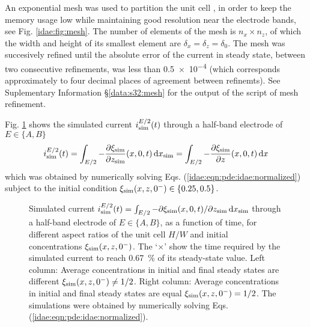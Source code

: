 An exponential mesh was used to partition the unit cell \cite[\S7.2]{Britz:2016:},
in order to keep the memory usage low while maintaining good resolution near the electrode bands, see Fig. \ref{idae:fig:mesh}.
The number of elements of the mesh is $n_{x} \times n_{z}$,
of which the width and height of its smallest element are $\delta_{x} = \delta_{z} = \delta_{0}$.
The mesh was succesively refined until the absolute error of the current in steady state,
between two consecutive refinements, was less than \num{0,5e-4}
(which corresponds approximately to four decimal places of agreement between refinemts).
See Suplementary Information \S\ref{data:s32:mesh} for the output of the script of mesh refinement.

Fig. \ref{idae:fig:i_sim} shows the simulated current $i_{\mathrm{sim}}^{E/2}(t)$
through a half-band electrode of $E \in \{A,B\}$
\begin{equation}
	i_{\mathrm{sim}}^{E/2}(t)
	= \int_{E/2} -\frac{\partial \xi_{\mathrm{sim}}}{\partial z_{\mathrm{sim}}}(x,0,t) \,\mathrm{d}x_{\mathrm{sim}}
	= \int_{E/2} -\frac{\partial \xi_{\mathrm{sim}}}{\partial z}(x,0,t) \,\mathrm{d}x
\end{equation}
which was obtained by numerically solving Eqs. (\ref{idae:eqn:pde:idae:normalized})
subject to the initial condition $\xi\simu(x,z,0^{-}) \in \{\numlist[list-pair-separator={,}]{0,25; 0,5}\}$.

\begin{figure*}
	\centering


	\caption{
		Simulated current $i_{\mathrm{sim}}^{E/2}(t) = \int_{E/2} -\partial \xi_{\mathrm{sim}}(x,0,t)/ \partial z_{\mathrm{sim}} \,\mathrm{d}x_{\mathrm{sim}}$ through a half-band electrode of $E \in \{A,B\}$,
		as a function of time, for different aspect ratios of the unit cell $H/W$ and initial concentrations $\xi_{\mathrm{sim}}(x,z,0^{-})$.
		The `$\times$' show the time required by the simulated current to reach \SI{0,67}{\percent} of its steady-state value.
		Left column:
		Average concentrations in initial and final steady states are different $\xi_{\mathrm{sim}}(x,z,0^{-}) \neq 1/2$.
		Right column:
		Average concentrations in initial and final steady states are equal $\xi_{\mathrm{sim}}(x,z,0^{-}) = 1/2$.
		The simulations were obtained by numerically solving Eqs. (\ref{idae:eqn:pde:idae:normalized}).
	}
	\label{idae:fig:i_sim}
\end{figure*}

